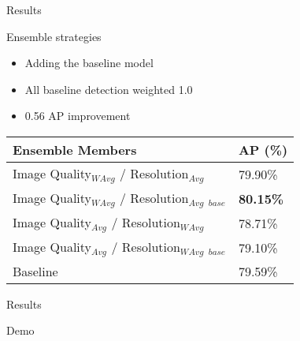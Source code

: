 \begin{frame}{Results}{}
    \begin{block}{Ensemble strategies}
    \begin{itemize}
        \item Adding the baseline model
        \item All baseline detection weighted 1.0
        \item 0.56 AP improvement
    \end{itemize}  
\end{block} 
    \begin{table}[h]
    \centering
    \begin{tabular}{|l|l|}
    \hline
    \textbf{Ensemble Members}                  & \textbf{AP (\%)} \\ \hline
    Image Quality$_{WAvg}$ / Resolution$_{Avg}$  & 79.90\% \\ \hline
    Image Quality$_{WAvg}$ / Resolution$_{Avg}$ $_{base}$ & \textbf{80.15\%} \\ \hline
    Image Quality$_{Avg}$ / Resolution$_{WAvg}$ & 78.71\% \\ \hline
    Image Quality$_{Avg}$ / Resolution$_{WAvg}$ $_{base}$ & 79.10\% \\ \hline
    Baseline                          & 79.59\% \\ \hline
    \end{tabular}
    \end{table}
\end{frame}

\begin{frame}{Results}{}
    \begin{block}{Demo}

\end{block} 
\end{frame}